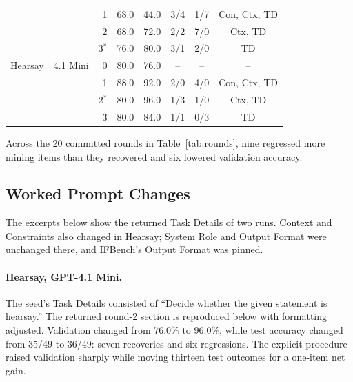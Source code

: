 \documentclass[10pt]{article} %
\begin{document}
\begin{table}[htbp]
\begin{center}
\begin{tabular}{llrccccc}
 & & 1 & 68.0 & 44.0 & 3/4 & 1/7 & Con, Ctx, TD \\
 & & 2 & 68.0 & 72.0 & 2/2 & 7/0 & Ctx, TD \\
 & & 3$^*$ & 76.0 & 80.0 & 3/1 & 2/0 & TD \\
\midrule
Hearsay & 4.1 Mini & 0 & 80.0 & 76.0 & -- & -- & -- \\
 & & 1 & 88.0 & 92.0 & 2/0 & 4/0 & Con, Ctx, TD \\
 & & 2$^*$ & 80.0 & 96.0 & 1/3 & 1/0 & Ctx, TD \\
 & & 3 & 80.0 & 84.0 & 1/1 & 0/3 & TD \\
\bottomrule
\end{tabular}
\end{center}
\end{table}

Across the 20 committed rounds in Table~\ref{tab:rounds}, nine regressed more mining items than they recovered and six
lowered validation accuracy.

\FloatBarrier
\subsection{Worked Prompt Changes}
\label{app:evolution}
The excerpts below show the returned Task Details of two runs. Context and Constraints also changed in Hearsay;
System Role and Output Format were unchanged there, and IFBench's Output Format was pinned.

\paragraph{Hearsay, GPT-4.1 Mini.}
The seed's Task Details consisted of ``Decide whether the given statement is hearsay.'' The returned round-2 section
is reproduced below with formatting adjusted. Validation changed from 76.0\% to 96.0\%, while test accuracy changed
from 35/49 to 36/49: seven recoveries and six regressions. The explicit procedure raised validation sharply while
moving thirteen test outcomes for a one-item net gain.
\end{document}
